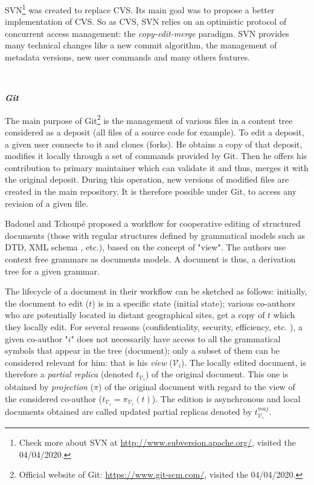 SVN\footnote{Check more about SVN at \url{http://www.subversion.apache.org/}, visited the 04/04/2020.} \cite{svn} was created to replace CVS. Its main goal was to propose a better implementation of CVS. So as CVS, SVN relies on an optimistic protocol of concurrent access management: the \textit{copy-edit-merge} paradigm. SVN provides many technical changes like a new commit algorithm, the management of metadata versions, new user commands and many others features.

~

\noindent\textbf{\textit{Git}}

The main purpose of Git\footnote{Official website of Git: \url{https://www.git-scm.com/}, visited the 04/04/2020.} is the management of various files in a content tree considered as a deposit (all files of a source code for example). To edit a deposit, a given user connects to it and clones (forks). He obtains a copy of that deposit, modifies it locally through a set of commands provided by Git. Then he offers his contribution to primary maintainer which can validate it and thus, merges it with the original deposit. During this operation, new versions of modified files are created in the main repository. It is therefore possible under Git, to access any revision of a given file. 



\label{chap2:sec:badouel-tchoupe-cooperative-editing}
Badouel and Tchoup\'e \citeyearpar{badouelTchoupeCmcs} proposed a workflow for cooperative editing of structured documents (those with regular structures defined by grammatical models such as DTD, XML schema \cite{xml2000}, etc.), based on the concept of "view". The authors use context free grammars as documents models. A document is thus, a derivation tree for a given grammar.

The lifecycle of a document in their workflow can be sketched as follows: initially, the document to edit ($t$) is in a specific state (initial state); various co-authors who are potentially located in distant geographical sites, get a copy of $t$ which they locally edit. For several reasons (confidentiality, security, efficiency, etc. \cite{tchoupeAtemkeng2}), a given co-author "$i$" does not necessarily have access to all the grammatical symbols that appear in the tree (document);  only a subset of them can be considered relevant for him: that is his \textit{view} ($\mathcal{V}_i$). The locally edited document, is therefore a \textit{partial replica} (denoted $t_{\mathcal{V}_i}$) of the original document. This one is obtained by \textit{projection} ($\pi$) of the original document with regard to the view of the considered co-author ($t_{\mathcal{V}_i}=\pi_{\mathcal{V}_i}(t)$). The edition is asynchronous and local documents obtained are called updated partial replicas denoted by $t_{\mathcal{V}_i}^{maj}$.

